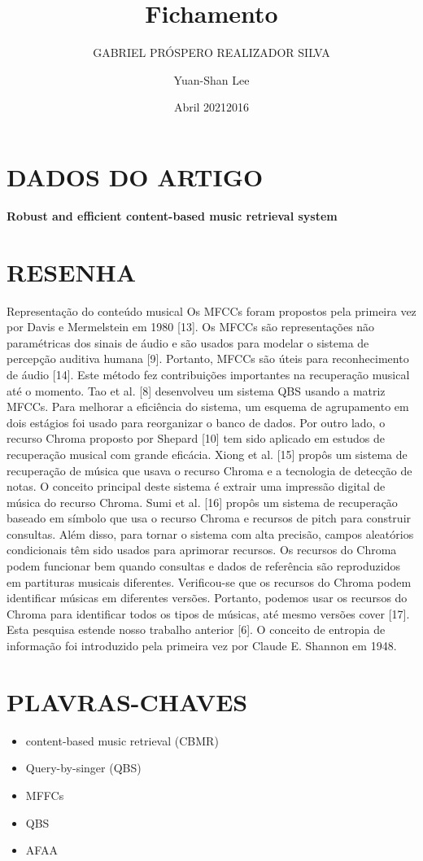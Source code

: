 \documentclass{article}
\title{Fichamento}
\author{GABRIEL PRÓSPERO REALIZADOR  SILVA}
\date{Abril 2021}
\begin{document}
\maketitle

\section{DADOS DO ARTIGO}
\textbf{Robust and efficient content-based music retrieval system \\}
\author{Yuan-Shan Lee \\}
\date{2016}

\section{RESENHA}
Representação do conteúdo musical Os MFCCs foram propostos pela primeira vez por Davis e Mermelstein em 1980 [13]. Os MFCCs são representações não paramétricas dos sinais de áudio e são usados ​​para modelar o sistema de percepção auditiva humana [9]. Portanto, MFCCs são úteis para reconhecimento de áudio [14]. Este método fez contribuições importantes na recuperação musical até o momento. Tao et al. [8] desenvolveu um sistema QBS usando a matriz MFCCs. Para melhorar a eficiência do sistema, um esquema de agrupamento em dois estágios foi usado para reorganizar o banco de dados. Por outro lado, o recurso Chroma proposto por Shepard [10] tem sido aplicado em estudos de recuperação musical com grande eficácia. Xiong et al. [15] propôs um sistema de recuperação de música que usava o recurso Chroma e a tecnologia de detecção de notas. O conceito principal deste sistema é extrair uma impressão digital de música do recurso Chroma. Sumi et al. [16] propôs um sistema de recuperação baseado em símbolo que usa o recurso Chroma e recursos de pitch para construir consultas. Além disso, para tornar o sistema com alta precisão, campos aleatórios condicionais têm sido usados ​​para aprimorar recursos. Os recursos do Chroma podem funcionar bem quando consultas e dados de referência são reproduzidos em partituras musicais diferentes. Verificou-se que os recursos do Chroma podem identificar músicas em diferentes versões. Portanto, podemos usar os recursos do Chroma para identificar todos os tipos de músicas, até mesmo versões cover [17]. Esta pesquisa estende nosso trabalho anterior [6].
O conceito de entropia de informação foi introduzido pela primeira vez por Claude E. Shannon em 1948.

\section{PLAVRAS-CHAVES}
\begin{itemize}
    \item content-based music retrieval  (CBMR) 
    \item Query-by-singer (QBS)
    \item MFFCs
    \item QBS
    \item AFAA
\end{itemize}
\end{document}
